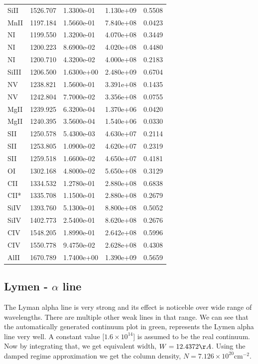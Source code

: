 \documentclass[12pt]{article}
\begin{document}
\begin{table}[H]
\begin{tabular}{l|l|l|l|l}
		SiII  & 1526.707 & 1.3300e-01 & 1.130e+09 & 0.5508  \\
		MnII  & 1197.184 & 1.5660e-01 & 7.840e+08 & 0.0423  \\
		NI    & 1199.550 & 1.3200e-01 & 4.070e+08 & 0.3449  \\
		NI    & 1200.223 & 8.6900e-02 & 4.020e+08 & 0.4480  \\
		NI    & 1200.710 & 4.3200e-02 & 4.000e+08 & 0.2183  \\
		SiIII & 1206.500 & 1.6300e+00 & 2.480e+09 & 0.6704  \\
		NV    & 1238.821 & 1.5600e-01 & 3.391e+08 & 0.1435  \\
		NV    & 1242.804 & 7.7000e-02 & 3.356e+08 & 0.0755  \\
		MgII  & 1239.925 & 6.3200e-04 & 1.370e+06 & 0.0420  \\
		MgII  & 1240.395 & 3.5600e-04 & 1.540e+06 & 0.0330  \\
		SII   & 1250.578 & 5.4300e-03 & 4.630e+07 & 0.2114  \\
		SII   & 1253.805 & 1.0900e-02 & 4.620e+07 & 0.2319  \\
		SII   & 1259.518 & 1.6600e-02 & 4.650e+07 & 0.4181  \\
		OI    & 1302.168 & 4.8000e-02 & 5.650e+08 & 0.3129  \\
		CII   & 1334.532 & 1.2780e-01 & 2.880e+08 & 0.6838  \\
		CII*  & 1335.708 & 1.1500e-01 & 2.880e+08 & 0.2679  \\
		SiIV  & 1393.760 & 5.1300e-01 & 8.800e+08 & 0.5052  \\
		SiIV  & 1402.773 & 2.5400e-01 & 8.620e+08 & 0.2676  \\
		CIV   & 1548.205 & 1.8990e-01 & 2.642e+08 & 0.5996  \\
		CIV   & 1550.778 & 9.4750e-02 & 2.628e+08 & 0.4308  \\
		AlII  & 1670.789 & 1.7400e+00 & 1.390e+09 & 0.5659 \\
	\end{tabular}
\end{table}


\subsection{Lymen - $\alpha$ line}

The Lyman alpha line is very strong and its effect is noticeble over wide range of wavelengths. There are multiple other weak lines in that range. We can see that the automatically generated continuum plot in green, represents the Lymen alpha line very well. A constant value [$1.6 \times 10^{14}$] is assumed to be the real continuum. \\
Now by integrating that, we get equivalent width, $W = 12.4372 \AA$.
Using the damped regime approximation we get the column density, $N = 7.126 \times 10^{20} $cm$^{-2}$.\\
\end{document}
